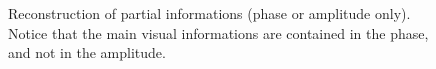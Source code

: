 \begin{figure}[htbp]
 \centering
 \hspace{1cm}
 \caption{Reconstruction of partial informations (phase or amplitude only). Notice that the main visual informations are contained in the phase, and not in the amplitude.}
 \label{fig:fourier:matlab:partial}
\end{figure}

